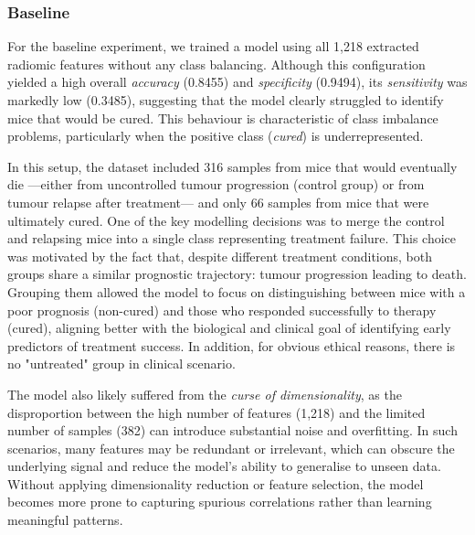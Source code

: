 \documentclass[12pt, a4paper]{report}
\begin{document}
\subsubsection{Baseline}
For the baseline experiment, we trained a model using all 1,218 extracted radiomic features without any class balancing. Although this configuration yielded a high overall \textit{accuracy} (0.8455) and \textit{specificity} (0.9494), its \textit{sensitivity} was markedly low (0.3485), suggesting that the model clearly struggled to identify mice that would be cured. This behaviour is characteristic of class imbalance problems, particularly when the positive class (\textit{cured}) is underrepresented. 

\begin{table}[H]
\centering
\renewcommand{\arraystretch}{1.5} %
\normalsize %
\caption{Baseline experiment (All Features)}
\end{table}

In this setup, the dataset included 316 samples from mice that would eventually die —either from uncontrolled tumour progression (control group) or from tumour relapse after treatment— and only 66 samples from mice that were ultimately cured. One of the key modelling decisions was to merge the control and relapsing mice into a single class representing treatment failure. This choice was motivated by the fact that, despite different treatment conditions, both groups share a similar prognostic trajectory: tumour progression leading to death. Grouping them allowed the model to focus on distinguishing between mice with a poor prognosis (non-cured) and those who responded successfully to therapy (cured), aligning better with the biological and clinical goal of identifying early predictors of treatment success. In addition, for obvious ethical reasons, there is no "untreated" group in clinical scenario.

The model also likely suffered from the \textit{curse of dimensionality}, as the disproportion between the high number of features (1,218) and the limited number of samples (382) can introduce substantial noise and overfitting. In such scenarios, many features may be redundant or irrelevant, which can obscure the underlying signal and reduce the model’s ability to generalise to unseen data. Without applying dimensionality reduction or feature selection, the model becomes more prone to capturing spurious correlations rather than learning meaningful patterns.
\end{document}
